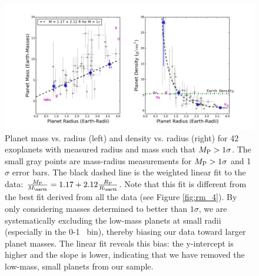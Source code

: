 \documentclass[11pt]{aastex}
\begin{document}
\begin{figure}[htbp] %
   \centering
    \includegraphics[width=6in]{mr_small_1sig.png} 
   \caption{\small Planet mass vs. radius (left) and density vs. radius (right) for 42 exoplanets with measured radius and mass such that $M_{\rm P} > 1\sigma$.  The small gray points are mass-radius measurements for $M_{\rm P} > 1\sigma$ and 1$\sigma$ error bars.  The black dashed line is the weighted linear fit to the data: $\frac{\mpl}{\mearth} = 1.17 + 2.12 \frac{\rpl}{\rearth}$.  Note that this fit is different from the best fit derived from all the data (see Figure \ref{fig:rm_4}).  By only considering masses determined to better than $1\sigma$, we are systematically excluding the low-mass planets at small radii (especially in the 0-1 \rearth\ bin), thereby biasing our data toward larger planet masses.  The linear fit reveals this bias: the y-intercept is higher and the slope is lower, indicating that we have removed the low-mass, small planets from our sample.}
   \label{fig:rm_4_1sig}
\end{figure}
\end{document}
